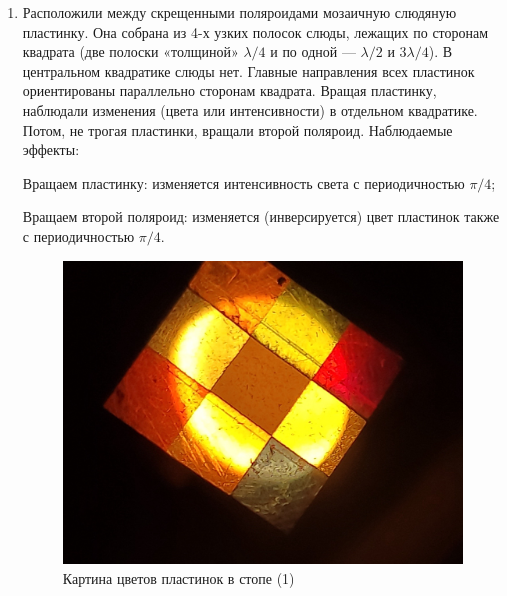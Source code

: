 \documentclass[a4paper, 12pt]{article}%
\begin{document}
\begin{enumerate}
\item Расположили между скрещенными поляроидами мозаичную слюдяную 	пластинку. Она собрана из 4-х узких полосок слюды, лежащих по сторонам квадрата (две полоски «толщиной» $\lambda/4$ и по одной --- $\lambda/2$ и $3\lambda/4$). В центральном квадратике слюды нет. Главные направления всех пластинок ориентированы параллельно сторонам квадрата. Вращая пластинку, наблюдали изменения (цвета или интенсивности) в отдельном квадратике. Потом, не трогая пластинки, вращали второй поляроид. Наблюдаемые эффекты:

Вращаем пластинку: изменяется интенсивность света с периодичностью $\pi/4$;

Вращаем второй поляроид: изменяется (инверсируется) цвет пластинок также с периодичностью  $\pi/4$.
		    
\begin{figure}[h!]
        \begin{center}
            \begin{minipage}[h!]{0.48\linewidth}
                \includegraphics[width=1\linewidth]{images/stopa_1.jpg}
                \caption{Картина цветов пластинок в стопе (1)}
                \label{picture_2}
            \end{minipage}
            \hfill
            \begin{minipage}[h!]{0.48\linewidth}

\end{minipage}
\end{center}
\end{figure}
\end{enumerate}
\end{document}
